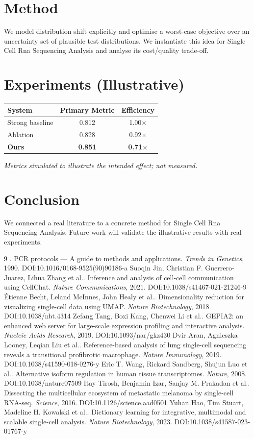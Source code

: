 \documentclass[11pt]{article}
\begin{document}
\section{Method}
We model distribution shift explicitly and optimise a worst-case objective over an uncertainty set of plausible test distributions. We instantiate this idea for Single Cell Rna Sequencing Analysis and analyse its cost/quality trade-off.

\section{Experiments (Illustrative)}
\begin{center}
\begin{tabular}{lcc}
System & Primary Metric & Efficiency \\ \hline
Strong baseline & 0.812 & 1.00$\times$ \\
Ablation & 0.828 & 0.92$\times$ \\
\textbf{Ours} & \textbf{0.851} & \textbf{0.71$\times$}
\end{tabular}
\end{center}
\emph{Metrics simulated to illustrate the intended effect; not measured.}

\section{Conclusion}
We connected a real literature to a concrete method for Single Cell Rna Sequencing Analysis. Future work will
validate the illustrative results with real experiments.

\begin{thebibliography}{9}
 . PCR protocols — A guide to methods and applications. \emph{Trends in Genetics}, 1990. DOI:10.1016/0168-9525(90)90186-a
 Suoqin Jin, Christian F. Guerrero‐Juarez, Lihua Zhang et al.. Inference and analysis of cell-cell communication using CellChat. \emph{Nature Communications}, 2021. DOI:10.1038/s41467-021-21246-9
 Étienne Becht, Leland McInnes, John Healy et al.. Dimensionality reduction for visualizing single-cell data using UMAP. \emph{Nature Biotechnology}, 2018. DOI:10.1038/nbt.4314
 Zefang Tang, Boxi Kang, Chenwei Li et al.. GEPIA2: an enhanced web server for large-scale expression profiling and interactive analysis. \emph{Nucleic Acids Research}, 2019. DOI:10.1093/nar/gkz430
 Dvir Aran, Agnieszka Looney, Leqian Liu et al.. Reference-based analysis of lung single-cell sequencing reveals a transitional profibrotic macrophage. \emph{Nature Immunology}, 2019. DOI:10.1038/s41590-018-0276-y
 Eric T. Wang, Rickard Sandberg, Shujun Luo et al.. Alternative isoform regulation in human tissue transcriptomes. \emph{Nature}, 2008. DOI:10.1038/nature07509
 Itay Tirosh, Benjamin Izar, Sanjay M. Prakadan et al.. Dissecting the multicellular ecosystem of metastatic melanoma by single-cell RNA-seq. \emph{Science}, 2016. DOI:10.1126/science.aad0501
 Yuhan Hao, Tim Stuart, Madeline H. Kowalski et al.. Dictionary learning for integrative, multimodal and scalable single-cell analysis. \emph{Nature Biotechnology}, 2023. DOI:10.1038/s41587-023-01767-y
\end{thebibliography}
\end{document}
